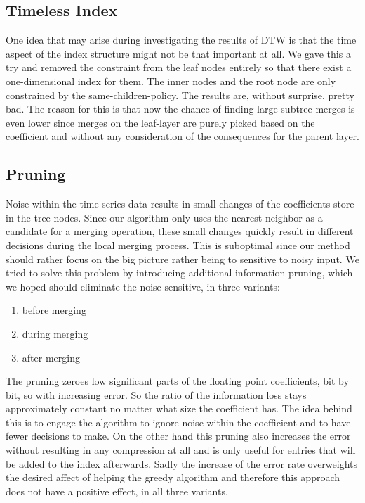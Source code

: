 \subsection{Timeless Index}
\label{ssec:algorithm:fail:timeless}

One idea that may arise during investigating the results of DTW is that the time aspect of the index structure might not be that important at all. We gave this a try and removed the constraint from the leaf nodes entirely so that there exist a one-dimensional index for them. The inner nodes and the root node are only constrained by the same-children-policy. The results are, without surprise, pretty bad. The reason for this is that now the chance of finding large subtree-merges is even lower since merges on the leaf-layer are purely picked based on the coefficient and without any consideration of the consequences for the parent layer.


\subsection{Pruning}
\label{ssec:algorithm:fail:pruning}

Noise within the time series data results in small changes of the coefficients store in the tree nodes. Since our algorithm only uses the nearest neighbor as a candidate for a merging operation, these small changes quickly result in different decisions during the local merging process. This is suboptimal since our method should rather focus on the big picture rather being to sensitive to noisy input. We tried to solve this problem by introducing additional information pruning, which we hoped should eliminate the noise sensitive, in three variants:

\begin{enumerate}
    \item before merging
    \item during merging
    \item after merging
\end{enumerate}

The pruning zeroes low significant parts of the floating point coefficients, bit by bit, so with increasing error. So the ratio of the information loss stays approximately constant no matter what size the coefficient has. The idea behind this is to engage the algorithm to ignore noise within the coefficient and to have fewer decisions to make. On the other hand this pruning also increases the error without resulting in any compression at all and is only useful for entries that will be added to the index afterwards. Sadly the increase of the error rate overweights the desired affect of helping the greedy algorithm and therefore this approach does not have a positive effect, in all three variants.

